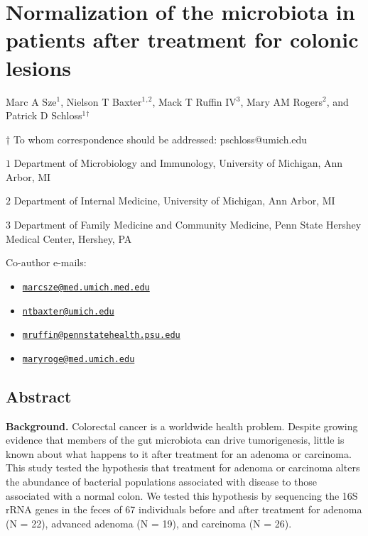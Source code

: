 \documentclass[12pt,]{article}
\title{}
\author{}
\date{}
\providecommand{\tightlist}{%
  \setlength{\itemsep}{0pt}\setlength{\parskip}{0pt}}
\begin{document}
\section{Normalization of the microbiota in patients after treatment for
colonic
lesions}\label{normalization-of-the-microbiota-in-patients-after-treatment-for-colonic-lesions}

\begin{center}
\vspace{25mm}

Marc A Sze${^1}$, Nielson T Baxter${^1}$${^,}$${^2}$, Mack T Ruffin IV${^3}$, Mary AM Rogers${^2}$, and Patrick D Schloss${^1}$${^\dagger}$

\vspace{20mm}

$\dagger$ To whom correspondence should be addressed: pschloss@umich.edu

$1$ Department of Microbiology and Immunology, University of Michigan, Ann Arbor, MI

$2$ Department of Internal Medicine, University of Michigan, Ann Arbor, MI

$3$ Department of Family Medicine and Community Medicine, Penn State Hershey Medical Center, Hershey, PA


\end{center}

Co-author e-mails:

\begin{itemize}
\tightlist
\item
  \href{mailto:marcsze@med.umich.med.edu}{\nolinkurl{marcsze@med.umich.med.edu}}
\item
  \href{mailto:ntbaxter@umich.edu}{\nolinkurl{ntbaxter@umich.edu}}
\item
  \href{mailto:mruffin@pennstatehealth.psu.edu}{\nolinkurl{mruffin@pennstatehealth.psu.edu}}
\item
  \href{mailto:maryroge@med.umich.edu}{\nolinkurl{maryroge@med.umich.edu}}
\end{itemize}

\newpage

\linenumbers

\subsection{Abstract}\label{abstract}

\textbf{Background.} Colorectal cancer is a worldwide health problem.
Despite growing evidence that members of the gut microbiota can drive
tumorigenesis, little is known about what happens to it after treatment
for an adenoma or carcinoma. This study tested the hypothesis that
treatment for adenoma or carcinoma alters the abundance of bacterial
populations associated with disease to those associated with a normal
colon. We tested this hypothesis by sequencing the 16S rRNA genes in the
feces of 67 individuals before and after treatment for adenoma (N = 22),
advanced adenoma (N = 19), and carcinoma (N = 26).
\end{document}
